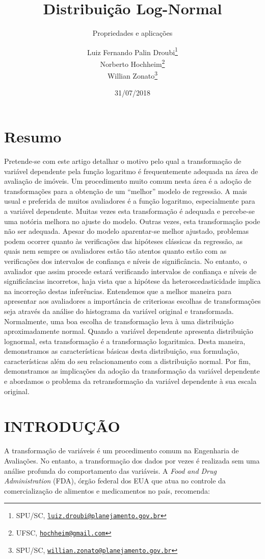 \documentclass[a4paper]{article}
\title{Distribuição Log-Normal}
\subtitle{Propriedades e aplicações}
\author{Luiz Fernando Palin Droubi\footnote{SPU/SC,
  \href{mailto:luiz.droubi@planejamento.gov.br}{\nolinkurl{luiz.droubi@planejamento.gov.br}}} \\ Norberto Hochheim\footnote{UFSC,
  \href{mailto:hochheim@gmail.com}{\nolinkurl{hochheim@gmail.com}}} \\ Willian Zonato\footnote{SPU/SC,
  \href{mailto:willian.zonato@planejamento.gov.br}{\nolinkurl{willian.zonato@planejamento.gov.br}}}}
\date{31/07/2018}
\begin{document}
\maketitle

\section*{Resumo}\label{resumo}

Pretende-se com este artigo detalhar o motivo pelo qual a transformação
de variável dependente pela função logaritmo é frequentemente adequada
na área de avaliação de imóveis. Um procedimento muito comum nesta área
é a adoção de transformações para a obtenção de um ``melhor'' modelo de
regressão. A mais usual e preferida de muitos avaliadores é a função
logaritmo, especialmente para a variável dependente. Muitas vezes esta
transformação é adequada e percebe-se uma notória melhora no ajuste do
modelo. Outras vezes, esta transformação pode não ser adequada. Apesar
do modelo aparentar-se melhor ajustado, problemas podem ocorrer quanto
às verificações das hipóteses clássicas da regressão, as quais nem
sempre os avaliadores estão tão atentos quanto estão com as verificações
dos intervalos de confiança e níveis de significância. No entanto, o
avaliador que assim procede estará verificando intervalos de confiança e
níveis de significâncias incorretos, haja vista que a hipótese da
heteroscedasticidade implica na incorreção destas inferências.
Entendemos que a melhor maneira para apresentar aos avaliadores a
importância de criteriosas escolhas de transformações seja através da
análise do histograma da variável original e transformada. Normalmente,
uma boa escolha de transformação leva à uma distribuição aproximadamente
normal. Quando a variável dependente apresenta distribuição lognormal,
esta transformação é a transformação logaritmica. Desta maneira,
demonstramos as características básicas desta distribuição, sua
formulação, características além do seu relacionamento com a
distribuição normal. Por fim, demonstramos as implicações da adoção da
transformação da variável dependente e abordamos o problema da
retransformação da variável dependente à sua escala original.

\section{INTRODUÇÃO}\label{introducao}

A transformação de variáveis é um procedimento comum na Engenharia de
Avaliações. No entanto, a transformação dos dados por vezes é realizada
sem uma análise profunda do comportamento das variáveis. A \emph{Food
and Drug Administration} (FDA), órgão federal dos EUA que atua no
controle da comercialização de alimentos e medicamentos no país,
recomenda:
\end{document}
